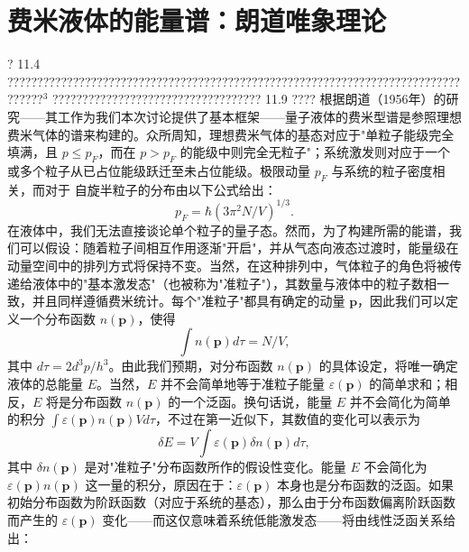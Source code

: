 \section{费米液体的能量谱：朗道唯象理论}\label{ux8d39ux7c73ux6db2ux4f53ux7684ux80fdux91cfux8c31ux6717ux9053ux552fux8c61ux7406ux8bba}
? 11.4 ??????????????????????????????????????????????????????????????????????????????????\(^{3}\)
??????????????????????????????????? 11.9 ????
根据朗道（1956年）的研究——其工作为我们本次讨论提供了基本框架——量子液体的费米型谱是参照理想费米气体的谱来构建的。众所周知，理想费米气体的基态对应于"单粒子能级完全填满，且 \(p \leq p_F\)，而在 \(p > p_F\) 的能级中则完全无粒子"；系统激发则对应于一个或多个粒子从已占位能级跃迁至未占位能级。极限动量 \(p_F\) 与系统的粒子密度相关，而对于
自旋半粒子的分布由以下公式给出：
\begin{equation}\tag{11.6.43}\label{eq:11.6.43}
p _ { F } = \hbar ( 3 \pi ^{2} N / V ) ^{1 / 3} .
\end{equation}
在液体中，我们无法直接谈论单个粒子的量子态。然而，为了构建所需的能谱，我们可以假设：随着粒子间相互作用逐渐"开启"，并从气态向液态过渡时，能量级在动量空间中的排列方式将保持不变。当然，在这种排列中，气体粒子的角色将被传递给液体中的"基本激发态"（也被称为"准粒子"），其数量与液体中的粒子数相一致，并且同样遵循费米统计。每个"准粒子"都具有确定的动量 \(\boldsymbol{p}\)，因此我们可以定义一个分布函数 \(n(\boldsymbol{p})\)，使得
\begin{equation}\tag{11.6.44}\label{eq:11.6.44}
\int n ( \mathbf { p } ) d \tau = N / V ,
\end{equation}
其中 \(d\tau = 2d^{3}p/h^{3}\)。由此我们预期，对分布函数 \(n(\boldsymbol{p})\) 的具体设定，将唯一确定液体的总能量 \(E\)。当然，\(E\) 并不会简单地等于准粒子能量 \(\varepsilon(\boldsymbol{p})\) 的简单求和；相反，\(E\) 将是分布函数 \(n(\boldsymbol{p})\) 的一个泛函。换句话说，能量 \(E\) 并不会简化为简单的积分 \(\int\varepsilon(\boldsymbol{p})n(\boldsymbol{p})Vd\tau\)，不过在第一近似下，其数值的变化可以表示为
\begin{equation}\tag{11.6.45}\label{eq:11.6.45}
\delta E = V \int \varepsilon ( \mathbf { p } ) \delta n ( \mathbf { p } ) d \tau ,
\end{equation}
其中 \(\delta n(\boldsymbol{p})\) 是对"准粒子"分布函数所作的假设性变化。能量 \(E\) 不会简化为 \(\varepsilon(\boldsymbol{p})n(\boldsymbol{p})\) 这一量的积分，原因在于：\(\varepsilon(\boldsymbol{p})\) 本身也是分布函数的泛函。如果初始分布函数为阶跃函数（对应于系统的基态），那么由于分布函数偏离阶跃函数而产生的 \(\varepsilon(\boldsymbol{p})\) 变化——而这仅意味着系统低能激发态——将由线性泛函关系给出：
